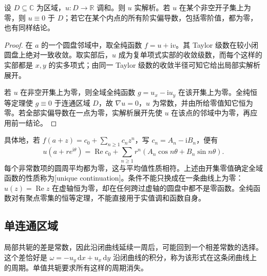 \begin{proposition}[实解析性与唯一延拓]\label{b3:prop:15-harmonic-analytic-continuation}
设 \(D\subseteq\mathbb C\) 为区域，\(u:D\to\mathbb R\) 调和。则 \(u\) 实解析。若 \(u\) 在某个非空开子集上为零，则 \(u\equiv0\) 于 \(D\)；若它在某个内点的所有阶实偏导数，包括零阶值，都为零，也有同样结论。
\end{proposition}
\begin{proof}
在 \(a\) 的一个圆盘邻域中，取全纯函数 \(f=u+\mathrm i v\)。其 Taylor 级数在较小闭圆盘上绝对一致收敛。取实部后，\(u\) 成为复单项式实部的收敛级数，而每个这样的实部都是 \(x,y\) 的实多项式；由同一 Taylor 级数的收敛半径可知它给出局部实解析展开。

若 \(u\) 在非空开集上为零，则全域全纯函数 \(g=u_x-\mathrm i u_y\) 在该开集上为零。全纯恒等定理使 \(g\equiv0\) 于连通区域 \(D\)，故 \(\nabla u=0\)，\(u\) 为常数，并由所给零值知它恒为零。若全部实偏导数在一点为零，实解析展开先使 \(u\) 在该点的邻域中为零，再应用前一结论。
\end{proof}

具体地，若 \(f(a+z)=c_0+\sum_{n\ge1}c_nz^n\)，写 \(c_n=A_n-\mathrm i B_n\)，便有
\[
 u(a+re^{\mathrm i\theta})
 =\operatorname{Re}c_0+
 \sum_{n\ge1}r^n(A_n\cos n\theta+B_n\sin n\theta).
\]
每个非常数项的圆周平均都为零，这与平均值性质相符。上述由开集零值确定全域函数的性质称为[unique continuation]。条件不能只换成在一条曲线上为零：\(u(z)=\operatorname{Re}z\) 在虚轴恒为零，却在任何跨过虚轴的圆盘中都不是零函数。全纯函数对有聚点零集的恒等定理，不能直接用于实值调和函数自身。

\subsection{单连通区域}
\label{b3:subsec:150203}

局部共轭的差是常数，因此沿闭曲线延续一周后，可能回到一个相差常数的选择。这个差恰好是 \(\omega=-u_y\,\mathrm dx+u_x\,\mathrm dy\) 沿闭曲线的积分，称为该形式在这条闭曲线上的周期。单值共轭要求所有这样的周期消失。

